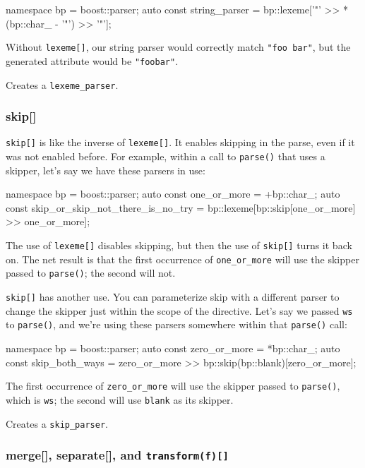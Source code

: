 \begin{code}
namespace bp = boost::parser;
auto const string_parser = bp::lexeme['"' >> *(bp::char_ - '"') >> '"'];
\end{code}

Without \texttt{lexeme{[}{]}}, our string parser would correctly match \texttt{"foo bar"}, but the generated attribute would be \texttt{"foobar"}.

Creates a \texttt{lexeme\_parser}.

\subsubsection{skip{[}{]}}

\texttt{skip{[}{]}} is like the inverse of \texttt{lexeme{[}{]}}. It enables skipping in the parse, even if it was not enabled before. For example, within a call to \texttt{parse()} that uses a skipper, let's say we have these parsers in use:

\begin{code}
namespace bp = boost::parser;
auto const one_or_more = +bp::char_;
auto const skip_or_skip_not_there_is_no_try = bp::lexeme[bp::skip[one_or_more] >> one_or_more];
\end{code}

The use of \texttt{lexeme{[}{]}} disables skipping, but then the use of \texttt{skip{[}{]}} turns it back on. The net result is that the first occurrence of \texttt{one\_or\_more} will use the skipper passed to \texttt{parse()}; the second will not.

\texttt{skip{[}{]}} has another use. You can parameterize skip with a different parser to change the skipper just within the scope of the directive. Let's say we passed \texttt{ws} to \texttt{parse()}, and we're using these parsers somewhere within that \texttt{parse()} call:

\begin{code}
namespace bp = boost::parser;
auto const zero_or_more = *bp::char_;
auto const skip_both_ways = zero_or_more >> bp::skip(bp::blank)[zero_or_more];
\end{code}

The first occurrence of \texttt{zero\_or\_more} will use the skipper passed to \texttt{parse()}, which is \texttt{ws}; the second will use \texttt{blank} as its skipper.

Creates a \texttt{skip\_parser}.

\subsubsection{\texorpdfstring{merge{[}{]}, separate{[}{]}, and \texttt{transform(f){[}{]}}}{merge{[}{]}, separate{[}{]}, and transform(f){[}{]}}}

